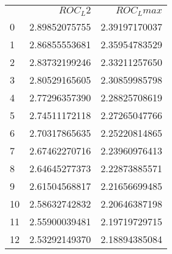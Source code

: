 \begin{tabular}{lrr}
 & $ROC_L2$ & $ROC_Lmax$ \\
0 & 2.89852075755 & 2.39197170037 \\
1 & 2.86855553681 & 2.35954783529 \\
2 & 2.83732199246 & 2.33211257650 \\
3 & 2.80529165605 & 2.30859985798 \\
4 & 2.77296357390 & 2.28825708619 \\
5 & 2.74511172118 & 2.27265047766 \\
6 & 2.70317865635 & 2.25220814865 \\
7 & 2.67462270716 & 2.23960976413 \\
8 & 2.64645277373 & 2.22873885571 \\
9 & 2.61504568817 & 2.21656699485 \\
10 & 2.58632742832 & 2.20646387198 \\
11 & 2.55900039481 & 2.19719729715 \\
12 & 2.53292149370 & 2.18894385084 \\
\end{tabular}
